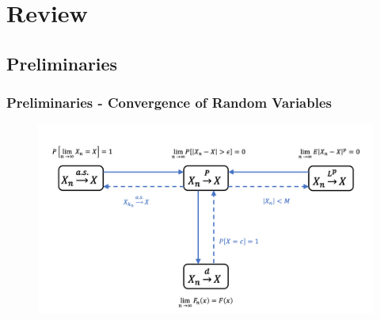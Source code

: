 \documentclass[serif,mathserif,professionalfont]{beamer}
\begin{document}
\section{Review}



\subsection{Preliminaries}



\begin{frame}
	
	\frametitle{Preliminaries - Convergence of Random Variables}
	
	\begin{figure}
		\includegraphics[width=1\linewidth]{W12F2}
	\end{figure}
	
\end{frame}
\end{document}
